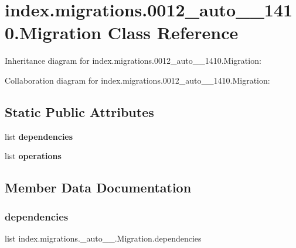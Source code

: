 \hypertarget{classindex_1_1migrations_1_10012__auto__20171024__1410_1_1Migration}{}\section{index.\+migrations.0012\+\_\+auto\+\_\+\_\+1410.Migration Class Reference}
\label{classindex_1_1migrations_1_10012__auto__20171024__1410_1_1Migration}


Inheritance diagram for index.\+migrations.0012\+\_\+auto\+\_\+\_\+1410.Migration\+:


Collaboration diagram for index.\+migrations.0012\+\_\+auto\+\_\+\_\+1410.Migration\+:
\subsection*{Static Public Attributes}
\begin{DoxyCompactItemize}
\item 
list {\bfseries dependencies}
\item 
list {\bfseries operations}
\end{DoxyCompactItemize}


\subsection{Member Data Documentation}
\mbox{\label{classindex_1_1migrations_1_10012__auto__20171024__1410_1_1Migration_a09061aebe6f2d1837d1da9ab1a3b494b}} 
\subsubsection{\texorpdfstring{dependencies}{dependencies}}
{\footnotesize\ttfamily list index.\+migrations.\+\_\+auto\+\_\+\_.\+Migration.\+dependencies\hspace{0.3cm}{\ttfamily [static]}}

